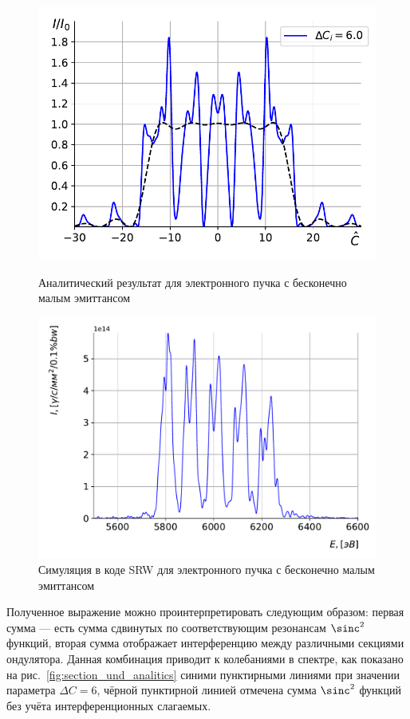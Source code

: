 \begin{figure}[h!]
	\centering  
	\begin{minipage}{0.49\textwidth}
		\centering
		\includegraphics[width=\textwidth]{pic/spec_from_sec_und.pdf}
		\caption{Аналитический результат для электронного пучка с бесконечно малым эмиттансом}
		\label{fig:section_und_analitics}
	\end{minipage}\hfill
	\begin{minipage}{0.51\textwidth}
		\centering
		\includegraphics[width=\textwidth]{pic/sim_und_spec_new.pdf}
		\caption{Симуляция в коде SRW для электронного пучка с бесконечно малым эмиттансом}
		\label{fig:section_und_SRW}
	\end{minipage}    
\end{figure}
Полученное выражение можно проинтерпретировать следующим образом: первая сумма --- есть сумма сдвинутых по соответствующим резонансам $\sinc^2$ функций, вторая сумма отображает интерференцию между различными секциями ондулятора. Данная комбинация приводит к колебаниями в спектре, как показано на рис.~\ref{fig:section_und_analitics} синими пунктирными линиями при значении параметра $\Delta C = 6$, чёрной пунктирной линией отмечена сумма $\sinc^2$ функций без учёта интерференционных слагаемых.

